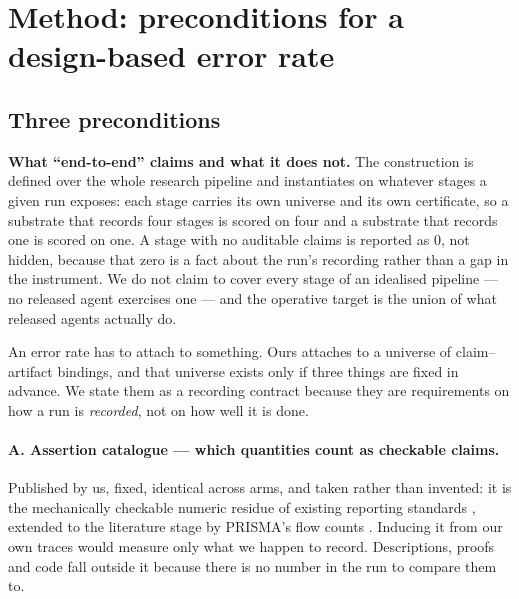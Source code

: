\documentclass[10pt]{article}
\newcommand{\RM}[1]{{#1}}
\begin{document}
\section{Method: preconditions for a design-based error rate}
\label{sec:method}

\subsection{Three preconditions}
\label{sec:three_faces}

\textbf{What ``end-to-end'' claims and what it does not.} The construction is
defined over the whole research pipeline and instantiates on whatever stages a
given run exposes: each stage carries its own universe and its own certificate,
so a substrate that records four stages is scored on four and a substrate that
records one is scored on one. A stage with no auditable claims is reported as
\RM{0}, not hidden, because that zero is a fact about the run's recording rather
than a gap in the instrument. We do not claim to cover every stage of an
idealised pipeline --- no released agent exercises one --- and the operative
target is the union of what released agents actually do.

An error rate has to attach to something. Ours attaches to a universe of
claim--artifact bindings, and that universe exists only if three things are
fixed in advance. We state them as a recording contract because they are
requirements on how a run is \emph{recorded}, not on how well it is done.

\paragraph{A. Assertion catalogue --- which quantities count as checkable
claims.} Published by us, fixed, identical across arms, and taken rather than
invented: it is the mechanically checkable numeric residue of existing reporting
standards \cite{mlrc}, extended to the literature stage by
PRISMA's flow counts \cite{prisma}. Inducing it from our own traces would
measure only what we happen to record. Descriptions, proofs and code fall
outside it because there is no number in the run to compare them to.
\end{document}

